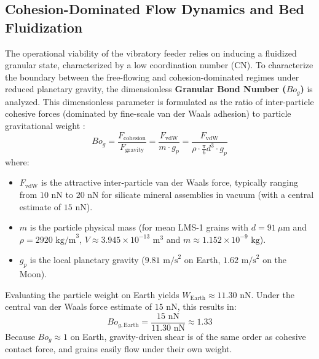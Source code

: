 \documentclass[preprint,12pt,authoryear]{elsarticle}
\begin{document}
\subsection{Cohesion-Dominated Flow Dynamics and Bed Fluidization}
The operational viability of the vibratory feeder relies on inducing a fluidized granular state, characterized by a low coordination number (CN). To characterize the boundary between the free-flowing and cohesion-dominated regimes under reduced planetary gravity, the dimensionless \textbf{Granular Bond Number ($Bo_g$)} is analyzed. This dimensionless parameter is formulated as the ratio of inter-particle cohesive forces (dominated by fine-scale van der Waals adhesion) to particle gravitational weight \citep{Madden2025, Scheeres2010}:
\begin{equation}
Bo_g = \frac{F_{\text{cohesion}}}{F_{\text{gravity}}} = \frac{F_{\mathrm{vdW}}}{m \cdot g_p} = \frac{F_{\mathrm{vdW}}}{\rho \cdot \frac{\pi}{6} d^3 \cdot g_p}
\end{equation}
where:
\begin{itemize}
    \item $F_{\mathrm{vdW}}$ is the attractive inter-particle van der Waals force, typically ranging from $10\text{ nN}$ to $20\text{ nN}$ for silicate mineral assemblies in vacuum (with a central estimate of $15\text{ nN}$).
    \item $m$ is the particle physical mass (for mean LMS-1 grains with $d = 91\ \mu\mathrm{m}$ and $\rho = 2920\text{ kg/m}^3$, $V \approx 3.945 \times 10^{-13}\text{ m}^3$ and $m \approx 1.152 \times 10^{-9}\text{ kg}$).
    \item $g_p$ is the local planetary gravity ($9.81\text{ m/s}^2$ on Earth, $1.62\text{ m/s}^2$ on the Moon).
\end{itemize}

Evaluating the particle weight on Earth yields $W_{\text{Earth}} \approx 11.30\text{ nN}$. Under the central van der Waals force estimate of $15\text{ nN}$, this results in:
\begin{equation}
Bo_{g,\text{Earth}} = \frac{15\text{ nN}}{11.30\text{ nN}} \approx 1.33
\end{equation}
Because $Bo_g \approx 1$ on Earth, gravity-driven shear is of the same order as cohesive contact force, and grains easily flow under their own weight.
\end{document}
